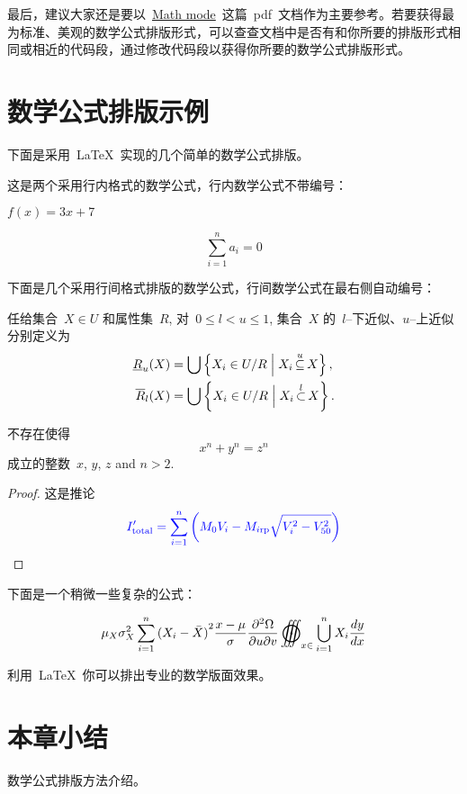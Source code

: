 最后，建议大家还是要以~\href{http://tug.ctan.org/cgi-bin/ctanPackageInformation.py?id=voss-mathmode}{Math mode}~这篇~pdf~文档作为主要参考。若要获得最为标准、美观的数学公式排版形式，可以查查文档中是否有和你所要的排版形式相同或相近的代码段，通过修改代码段以获得你所要的数学公式排版形式。

\section{数学公式排版示例}

下面是采用~\LaTeX~实现的几个简单的数学公式排版。

这是两个采用行内格式的数学公式，行内数学公式不带编号：

$f(x) = 3x + 7$

$$\sum_{i=1}^n a_i=0$$

下面是几个采用行间格式排版的数学公式，行间数学公式在最右侧自动编号：

\begin{definition}
  任给集合~$X \in U$ 和属性集~$R$, 对~$0\leqslant l < u \leqslant 1$,
  集合~$X$ 的~$l${--}下近似、$u${--}上近似分别定义为
     \begin{align}
\underline {R} _u (X) &=  \bigcup \left\{ {X_i  \in U/R\Bigm|X_i \mathop  \subseteq \limits^u  X} \right\}, \\
\overline {R} _l (X)  &=  \bigcup \left\{ {X_i  \in U/R\Bigm|X_i \mathop  \subset \limits^l X} \right\}.
   \end{align}
\end{definition}

\begin{theorem}[\hei 费马]
  {\upshape\kai 不存在使得~
  \begin{equation}
     x^n+y^n=z^n
  \end{equation}
  成立的整数~$x$, $y$, $z$ and $n>2$. }
\end{theorem}

\begin{proof}
  {\upshape\kai 这是推论
  \begin{equation}
     \textcolor[rgb]{0.00,0.00,1.00}{
     I'_{{\rm{total}}} = \sum\limits_{i = 1}^n
     {\left( {M_0 V_i - M_{i{\rm{rp}}} \sqrt{V_i^2 - V_{50}^2}}\right)}}
  \end{equation}}
\end{proof}

下面是一个稍微一些复杂的公式：

 \begin{equation}
{\mu _X}\sigma _X^2\sum\limits_{i = 1}^n {{{({X_i} - \bar X)}^2}} \frac{{x - \mu }}{\sigma }\frac{{{\partial ^2}\Omega }}{{\partial u\partial v}}\mathop{{\int\!\!\!\!\!\int\!\!\!\!\!\int}\mkern-31.2mu \bigodot}\nolimits_{x \in }
 {\bigcup\limits_{i = 1}^n {{X_i}} \frac{{dy}}{{dx}}}
\end{equation}

 利用~\LaTeX~你可以排出专业的数学版面效果。

\section*{本章小结}
数学公式排版方法介绍。
